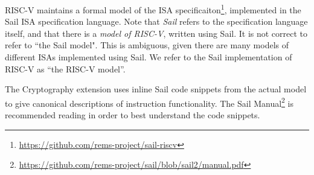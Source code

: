 
RISC-V maintains a formal model of the ISA specificaiton\footnote{\url{https://github.com/rems-project/sail-riscv}}, implemented
in the Sail ISA specification language\cite{sail}.
Note that {\em Sail} refers to the specification language itself,
and that there is a {\em model of RISC-V}, written using Sail.
It is not correct to refer to ``the Sail model".
This is ambiguous, given there are many models of different ISAs implemented
using Sail. We refer to the Sail implementation of RISC-V as
``the RISC-V model''.

The Cryptography extension uses inline Sail code snippets from the
actual model to give canonical descriptions of instruction
functionality.
The Sail Manual\footnote{\url{https://github.com/rems-project/sail/blob/sail2/manual.pdf}} is recommended reading in order to
best understand the code snippets.
